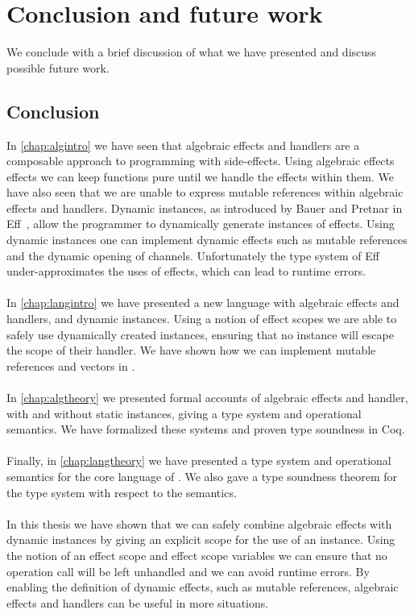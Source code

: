 \chapter{\label{chap:conclusion}Conclusion and future work}

We conclude with a brief discussion of what we have presented and discuss possible future work.

\section{Conclusion}
In \cref{chap:algintro} we have seen that algebraic effects and handlers are a composable approach to programming with side-effects.
Using algebraic effects effects we can keep functions pure until we handle the effects within them.
We have also seen that we are unable to express mutable references within algebraic effects and handlers.
Dynamic instances, as introduced by Bauer and Pretnar in Eff~\autocite{eff1}, allow the programmer to dynamically generate instances of effects.
Using dynamic instances one can implement dynamic effects such as mutable references and the dynamic opening of channels.
Unfortunately the type system of Eff under-approximates the uses of effects, which can lead to runtime errors.
\\\\
In \cref{chap:langintro} we have presented a new language \lang{} with algebraic effects and handlers, and dynamic instances.
Using a notion of effect scopes we are able to safely use dynamically created instances, ensuring that no instance will escape the scope of their handler.
We have shown how we can implement mutable references and vectors in \lang{}.
\\\\
In \cref{chap:algtheory} we presented formal accounts of algebraic effects and handler, with and without static instances, giving a type system and operational semantics.
We have formalized these systems and proven type soundness in Coq.
\\\\
Finally, in \cref{chap:langtheory} we have presented a type system and operational semantics for the core language of \lang{}.
We also gave a type soundness theorem for the type system with respect to the semantics.
\\\\
In this thesis we have shown that we can safely combine algebraic effects with dynamic instances by giving an explicit scope for the use of an instance.
Using the notion of an effect scope and effect scope variables we can ensure that no operation call will be left unhandled and we can avoid runtime errors.
By enabling the definition of dynamic effects, such as mutable references, algebraic effects and handlers can be useful in more situations.
 
